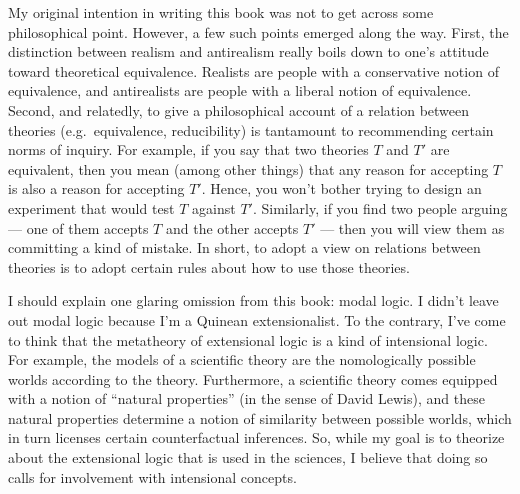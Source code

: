 \documentclass[12pt,fleqn,toc]{book}
\numberwithin{section}{chapter}
\numberwithin{subsection}{section}
\numberwithin{prop}{section}
\theoremstyle{definition}
\newcommand{\2}{\mathscr}
\newcommand{\7}{\mathbb}
\begin{document}
My original intention in writing this book was not to get across some
philosophical point.  However, a few such points emerged along the
way.  First, the distinction between realism and antirealism really
boils down to one's attitude toward theoretical equivalence.  Realists
are people with a conservative notion of equivalence, and antirealists
are people with a liberal notion of equivalence.  Second, and
relatedly, to give a philosophical account of a relation between
theories (e.g.\ equivalence, reducibility) is tantamount to
recommending certain norms of inquiry.  For example, if you say that
two theories $T$ and $T'$ are equivalent, then you mean (among other
things) that any reason for accepting $T$ is also a reason for
accepting $T'$.  Hence, you won't bother trying to design an
experiment that would test $T$ against $T'$.  Similarly, if you find
two people arguing --- one of them accepts $T$ and the other accepts
$T'$ --- then you will view them as committing a kind of mistake.  In
short, to adopt a view on relations between theories is to adopt
certain rules about how to use those theories.

I should explain one glaring omission from this book: modal logic.  I
didn't leave out modal logic because I'm a Quinean extensionalist.  To
the contrary, I've come to think that the metatheory of extensional
logic is a kind of intensional logic.  For example, the models of a
scientific theory are the nomologically possible worlds according to
the theory.  Furthermore, a scientific theory comes equipped with a
notion of ``natural properties'' (in the sense of David Lewis), and
these natural properties determine a notion of similarity between
possible worlds, which in turn licenses certain counterfactual
inferences.  So, while my goal is to theorize about the extensional
logic that is used in the sciences, I believe that doing so calls for
involvement with intensional concepts.

\end{document}
